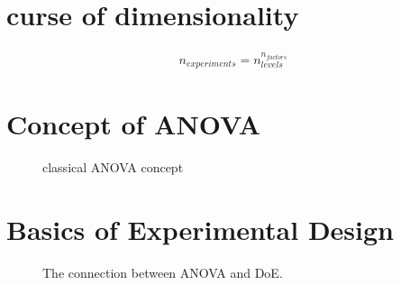 \documentclass[
  a4paper,
]{scrbook}
\begin{document}
\section{curse of dimensionality}\label{curse-of-dimensionality}

\begin{align}
n_{experiments} = n_{levels}^{n_{factors}}
\end{align}

\section{Concept of ANOVA}\label{concept-of-anova}

\begin{figure}[ht]


\caption{\label{fig-ANOVA-01}classical ANOVA concept}

\end{figure}%

\section{Basics of Experimental
Design}\label{basics-of-experimental-design}

\begin{figure}[ht]


\caption{\label{fig-DoE-01}The connection between ANOVA and DoE.}

\end{figure}%
\end{document}
